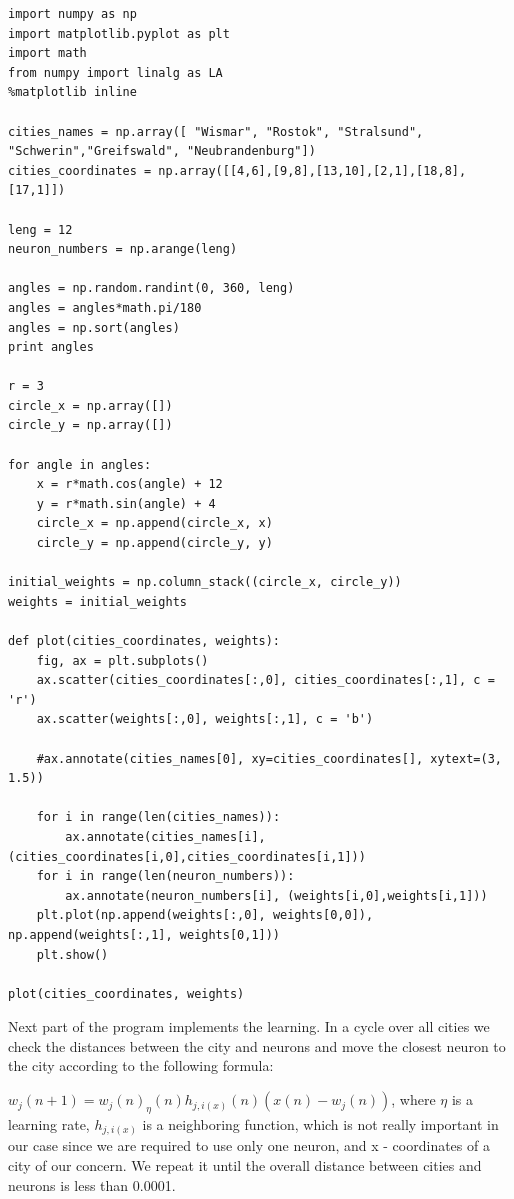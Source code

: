 \documentclass[a4paper, 12pt]{article}
\begin{document}
\lstset{language=Python}
\begin{lstlisting}[frame=single]
import numpy as np
import matplotlib.pyplot as plt
import math
from numpy import linalg as LA
%matplotlib inline

cities_names = np.array([ "Wismar", "Rostok", "Stralsund", "Schwerin","Greifswald", "Neubrandenburg"])
cities_coordinates = np.array([[4,6],[9,8],[13,10],[2,1],[18,8],[17,1]])

leng = 12
neuron_numbers = np.arange(leng)

angles = np.random.randint(0, 360, leng)
angles = angles*math.pi/180
angles = np.sort(angles)
print angles

r = 3
circle_x = np.array([])
circle_y = np.array([])

for angle in angles:
    x = r*math.cos(angle) + 12
    y = r*math.sin(angle) + 4
    circle_x = np.append(circle_x, x)
    circle_y = np.append(circle_y, y)

initial_weights = np.column_stack((circle_x, circle_y))
weights = initial_weights

def plot(cities_coordinates, weights):
    fig, ax = plt.subplots()
    ax.scatter(cities_coordinates[:,0], cities_coordinates[:,1], c = 'r')
    ax.scatter(weights[:,0], weights[:,1], c = 'b')

    #ax.annotate(cities_names[0], xy=cities_coordinates[], xytext=(3, 1.5))

    for i in range(len(cities_names)):
        ax.annotate(cities_names[i], (cities_coordinates[i,0],cities_coordinates[i,1]))
    for i in range(len(neuron_numbers)):
        ax.annotate(neuron_numbers[i], (weights[i,0],weights[i,1]))
    plt.plot(np.append(weights[:,0], weights[0,0]), np.append(weights[:,1], weights[0,1]))
    plt.show()

plot(cities_coordinates, weights)
\end{lstlisting}

Next part of the program implements the learning. In a cycle over all cities we check the distances between the city and neurons and move the closest neuron to the city according to the following formula:

$w_j(n+1) = w_j(n) _ \eta(n) h_{j,i(x)}(n)(x(n) - w_j(n))$,
where $\eta$ is a learning rate, $h_{j,i(x)}$ is a neighboring function, which is not really important in our case since we are required to use only one neuron, and x - coordinates of a city of our concern. We repeat it until the overall distance between cities and neurons is less than 0.0001.
\end{document}
